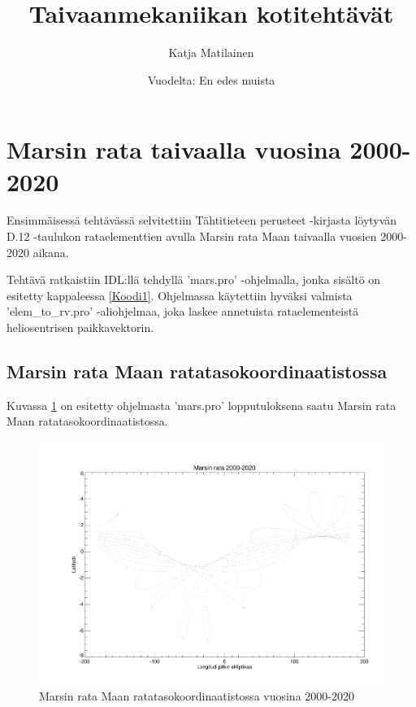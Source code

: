 \documentclass[12pt, a4paper]{article}
\author{Katja Matilainen}
\title{Taivaanmekaniikan kotitehtävät}
\date{Vuodelta: En edes muista}
\begin{document}
\begin{titlepage}
\maketitle
\end{titlepage}

\section[Tehtävä 1]{Marsin rata taivaalla vuosina 2000-2020}
Ensimmäisessä tehtävässä selvitettiin Tähtitieteen perusteet -kirjasta löytyvän D.12 -taulukon rataelementtien avulla Marsin rata Maan taivaalla vuosien 2000-2020 aikana.

Tehtävä ratkaistiin IDL:llä tehdyllä 'mars.pro' -ohjelmalla, jonka sisältö on esitetty kappaleessa \ref{Koodi1}. Ohjelmassa käytettiin hyväksi valmista 'elem\_to\_rv.pro' -aliohjelmaa, joka laskee annetuista rataelementeistä heliosentrisen paikkavektorin.

\subsection[Ekliptikarata]{Marsin rata Maan ratatasokoordinaatistossa}\label{Ekliptika}
Kuvassa \ref{Kuva1} on esitetty ohjelmasta 'mars.pro' lopputuloksena saatu Marsin rata Maan ratatasokoordinaatistossa.

\begin{figure}[H]
\centerline{\includegraphics[page=1,angle=0,width=0.8\paperwidth]{mars.pdf}}
\caption{Marsin rata Maan ratatasokoordinaatistossa vuosina 2000-2020}
\label{Kuva1}
\end{figure}
\end{document}
